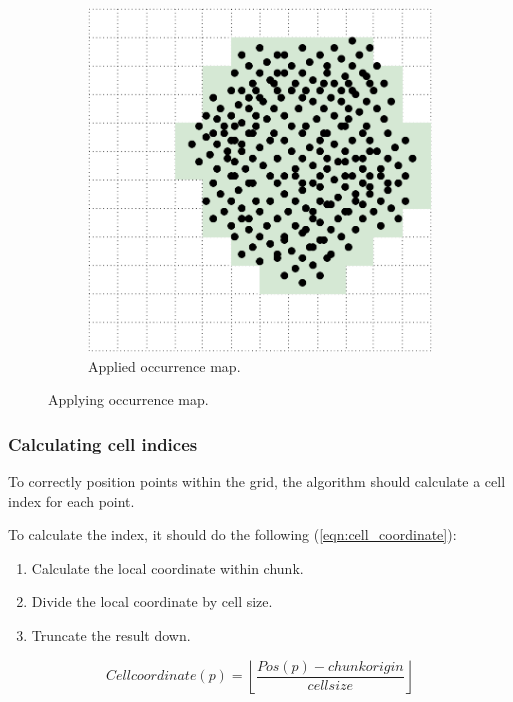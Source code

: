 \begin{figure}[ht]
    \begin{subfigure}[t]{0.4\textwidth}
        \includegraphics[width=\textwidth]{occurrence-map-applied.pdf}
        \caption{Applied occurrence map.}
    \end{subfigure}
    
    \caption{Applying occurrence map.}
    \label{fig:occurrence_map}
\end{figure}


\subsubsection{Calculating cell indices}

To correctly position points within the grid, the algorithm should calculate a cell index for each point.

To calculate the index, it should do the following (\ref{eqn:cell_coordinate}):
\begin{enumerate}
    \item Calculate the local coordinate within chunk.
    \item Divide the local coordinate by cell size.
    \item Truncate the result down.
\end{enumerate}

\begin{equation}
\label{eqn:cell_coordinate}
Cell coordinate(p) = \left \lfloor \frac{Pos(p) - chunk origin}{cell size} \right \rfloor
\end{equation}


